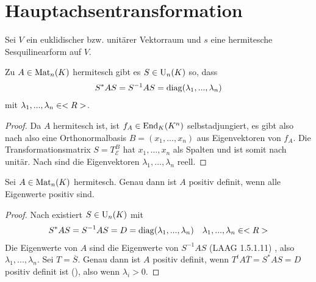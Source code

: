 \section{Hauptachsentransformation}

Sei $V$ ein euklidischer bzw. unitärer Vektorraum und $s$ eine hermitesche Sesquilinearform auf $V$.

\begin{proposition}
	Zu $A\in\operatorname{Mat}_n(K)$ hermitesch gibt es $S\in\operatorname{U}_n(K)$ so, dass
	\begin{align}
		S^*AS=S^{-1}AS=\operatorname{diag}(\lambda_1,...,\lambda_n)\notag
	\end{align}
	mit $\lambda_1,...,\lambda_n\in<R>$.
\end{proposition}
\begin{proof}
	Da $A$ hermitesch ist, ist $f_A\in\operatorname{End}_K(K^n)$ selbstadjungiert, es gibt also nach  also eine Orthonormalbasis $B=(x_1,...,x_n)$ aus Eigenvektoren von $f_A$. Die Transformationsmatrix $S=T^B_{\mathcal{E}}$ hat $x_1,...,x_n$ als Spalten und ist somit nach  unitär. Nach  sind die Eigenvektoren $\lambda_1,...,\lambda_n$ reell.
\end{proof}

\begin{conclusion}
	Sei $A\in\operatorname{Mat}_n(K)$ hermitesch. Genau dann ist $A$ positiv definit, wenn alle Eigenwerte positiv sind.
\end{conclusion}
\begin{proof}
	Nach  existiert $S\in\operatorname{U}_n(K)$ mit 
	\begin{align}
	S^*AS=S^{-1}AS=D=\operatorname{diag}(\lambda_1,...,\lambda_n)\quad \lambda_1,...,\lambda_n\in<R>\notag
	\end{align}
	Die Eigenwerte von $A$ sind die Eigenwerte von $S^{-1}AS$ (LAAG 1.5.1.11) %
	, also $\lambda_1,...,\lambda_n$. Sei $T=\overline{S}$. Genau dann ist $A$ positiv definit, wenn $T^tA\overline{T}=S^*AS=D$ positiv definit ist (), also wenn $\lambda_i>0$.
\end{proof}

